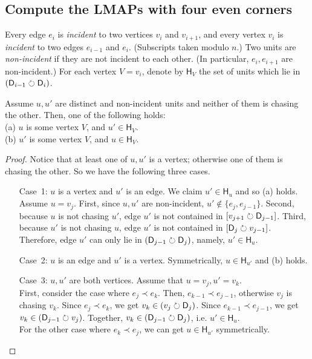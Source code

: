 \documentclass{ws-ijcga}
\begin{document}
\subsection{Compute the LMAPs with four even corners}

\newcommand{\SH}{\mathsf{H}}

Every edge $e_i$ is \emph{incident} to two vertices $v_i$ and $v_{i+1}$,
  and every vertex $v_i$ is \emph{incident} to two edges $e_{i-1}$ and $e_{i}$. (Subscripts taken modulo $n$.)
Two units are \emph{non-incident} if they are not incident to each other. (In particular, $e_i,e_{i+1}$ are non-incident.)
For each vertex $V=v_i$, denote by $\SH_V$ the set of units which lie in $(\mathsf{D}_{i-1}\circlearrowright \mathsf{D}_i)$.

\begin{claim}\label{claim:H}
  Assume $u,u'$ are distinct and non-incident units and neither of them is chasing the other. Then, one of the following holds:\\
    (a) $u$ is some vertex $V$, and $u'\in \SH_V$. \\ (b) $u'$ is some vertex $V$, and $u\in \SH_V$.
\end{claim}

\begin{proof} Notice that at least one of $u,u'$ is a vertex; otherwise one of them is chasing the other. So we have the following three cases.
\begin{enumerate}
\item[Case~1:] $u$ is a vertex and $u'$ is an edge. We claim $u'\in \SH_{u}$ and so (a) holds.\\
    Assume $u=v_j$. First, since $u,u'$ are non-incident, $u'\notin \{e_j,e_{j-1}\}$.
    Second, because $u$ is not chasing $u'$, edge $u'$ is not contained in $[ v_{j+1}\circlearrowright \mathsf{D}_{j-1}]$.
    Third, because $u'$ is not chasing $u$, edge $u'$ is not contained in $[\mathsf{D}_j\circlearrowright v_{j-1}]$.
    Therefore, edge $u'$ can only lie in $(\mathsf{D}_{j-1}\circlearrowright \mathsf{D}_j)$, namely, $u'\in\SH_{u}$.

\item[Case~2:] $u$ is an edge and $u'$ is a vertex. Symmetrically, $u\in \SH_{u'}$ and (b) holds.

\item[Case~3:] $u,u'$ are both vertices. Assume that $u=v_j,u'=v_k$.\\
    First, consider the case where $e_j\prec e_k$.
    Then, $e_{k-1}\prec e_{j-1}$, otherwise $v_j$ is chasing $v_k$.
    Since $e_j\prec e_k$, we get $v_k\in (v_j\circlearrowright \mathsf{D}_j)$. Since $e_{k-1}\prec e_{j-1}$, we get $v_k\in (\mathsf{D}_{j-1}\circlearrowright v_j)$.
    Together, $v_k\in (\mathsf{D}_{j-1}\circlearrowright \mathsf{D}_j)$, i.e. $u'\in \SH_{u}$.\\
    For the other case where $e_k\prec e_j$, we can get $u\in \SH_{u'}$ symmetrically.
\end{enumerate}
\end{proof}
\end{document}
